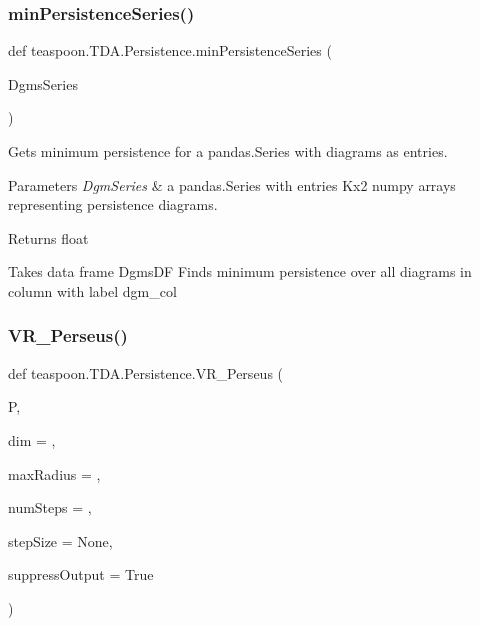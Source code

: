 \subsubsection{\texorpdfstring{min\+Persistence\+Series()}{minPersistenceSeries()}}
{\footnotesize\ttfamily def teaspoon.\+T\+D\+A.\+Persistence.\+min\+Persistence\+Series (\begin{DoxyParamCaption}\item[{}]{Dgms\+Series }\end{DoxyParamCaption})}



Gets minimum persistence for a pandas.\+Series with diagrams as entries. 


\begin{DoxyParams}{Parameters}
{\em Dgm\+Series} & a pandas.\+Series with entries Kx2 numpy arrays representing persistence diagrams.\\
\hline
\end{DoxyParams}
\begin{DoxyReturn}{Returns}
float \begin{DoxyVerb}Takes data frame DgmsDF
Finds minimum persistence over all diagrams in
column with label dgm_col
\end{DoxyVerb}
 
\end{DoxyReturn}
\mbox{\label{namespaceteaspoon_1_1_t_d_a_1_1_persistence_ae3954f45636c5f88b8e7cb7b422eea3d}} 
\subsubsection{\texorpdfstring{V\+R\+\_\+\+Perseus()}{VR\_Perseus()}}
{\footnotesize\ttfamily def teaspoon.\+T\+D\+A.\+Persistence.\+V\+R\+\_\+\+Perseus (\begin{DoxyParamCaption}\item[{}]{P,  }\item[{}]{dim = {},  }\item[{}]{max\+Radius = {},  }\item[{}]{num\+Steps = {},  }\item[{}]{step\+Size = {\ttfamily None},  }\item[{}]{suppress\+Output = {\ttfamily True} }\end{DoxyParamCaption})}



